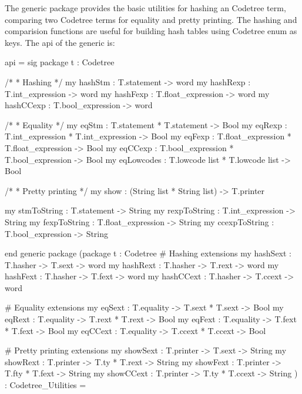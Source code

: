 The generic package  provides
the basic utilities for hashing an Codetree term, comparing two
Codetree terms for equality and pretty printing.  The hashing and comparision
functions are useful for building hash tables using Codetree enum as keys.
The api of the generic is:
\begin{SML}
api  =
sig
   package t : Codetree 

   /*
    * Hashing
    */
   my hashStm   : T.statement -> word
   my hashRexp  : T.int_expression -> word
   my hashFexp  : T.float_expression -> word
   my hashCCexp : T.bool_expression -> word

   /*
    * Equality
    */
   my eqStm     : T.statement * T.statement -> Bool
   my eqRexp    : T.int_expression * T.int_expression -> Bool
   my eqFexp    : T.float_expression * T.float_expression -> Bool
   my eqCCexp   : T.bool_expression * T.bool_expression -> Bool
   my eqLowcodes : T.lowcode list * T.lowcode list -> Bool

   /*
    * Pretty printing 
    */
   my show : (String list * String list) -> T.printer

   my stmToString   : T.statement -> String
   my rexpToString  : T.int_expression -> String
   my fexpToString  : T.float_expression -> String
   my ccexpToString : T.bool_expression -> String

end
generic package  
  (package t : Codetree
   #  Hashing extensions 
   my hashSext  : T.hasher -> T.sext -> word
   my hashRext  : T.hasher -> T.rext -> word
   my hashFext  : T.hasher -> T.fext -> word
   my hashCCext : T.hasher -> T.ccext -> word

   #  Equality extensions 
   my eqSext  : T.equality -> T.sext * T.sext -> Bool
   my eqRext  : T.equality -> T.rext * T.rext -> Bool
   my eqFext  : T.equality -> T.fext * T.fext -> Bool
   my eqCCext : T.equality -> T.ccext * T.ccext -> Bool

   #  Pretty printing extensions 
   my showSext  : T.printer -> T.sext -> String
   my showRext  : T.printer -> T.ty * T.rext -> String
   my showFext  : T.printer -> T.fty * T.fext -> String
   my showCCext : T.printer -> T.ty * T.ccext -> String
  ) : Codetree_Utilities =
\end{SML} 

